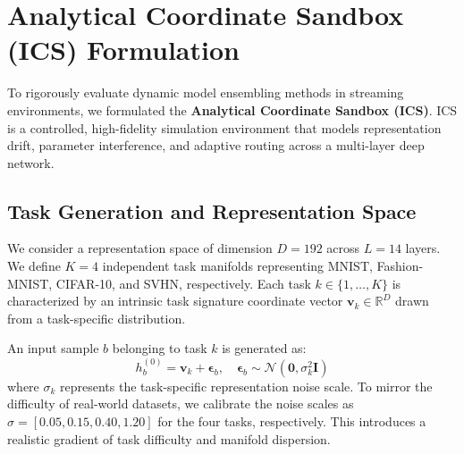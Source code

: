 \documentclass{article}
\theoremstyle{plain}
\theoremstyle{definition}
\theoremstyle{remark}
\begin{document}










\newpage
\appendix
\onecolumn
\section{Analytical Coordinate Sandbox (ICS) Formulation}
\label{appendix:ics}

To rigorously evaluate dynamic model ensembling methods in streaming environments, we formulated the \textbf{Analytical Coordinate Sandbox (ICS)}. ICS is a controlled, high-fidelity simulation environment that models representation drift, parameter interference, and adaptive routing across a multi-layer deep network.

\subsection{Task Generation and Representation Space}
We consider a representation space of dimension $D = 192$ across $L = 14$ layers. We define $K = 4$ independent task manifolds representing MNIST, Fashion-MNIST, CIFAR-10, and SVHN, respectively. Each task $k \in \{1, \dots, K\}$ is characterized by an intrinsic task signature coordinate vector $\mathbf{v}_k \in \mathbb{R}^D$ drawn from a task-specific distribution. 

An input sample $b$ belonging to task $k$ is generated as:
\begin{equation}
h_{b}^{(0)} = \mathbf{v}_k + \boldsymbol{\epsilon}_b, \quad \boldsymbol{\epsilon}_b \sim \mathcal{N}(\mathbf{0}, \sigma_k^2 \mathbf{I})
\end{equation}
where $\sigma_k$ represents the task-specific representation noise scale. To mirror the difficulty of real-world datasets, we calibrate the noise scales as $\sigma = [0.05, 0.15, 0.40, 1.20]$ for the four tasks, respectively. This introduces a realistic gradient of task difficulty and manifold dispersion.
\end{document}
